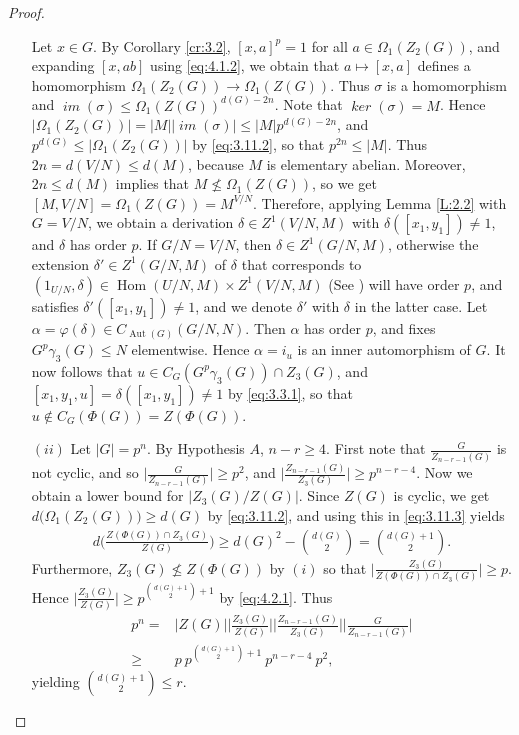 \documentclass[preprint,sort&compress,12pt]{elsarticle}
\theoremstyle{definition}
\numberwithin{equation}{theorem}
\DeclareMathOperator{\Aut}{\operatorname{Aut}}
\DeclareMathOperator{\Hom}{\operatorname{Hom}}
\DeclareMathOperator{\Ker}{\mathit{ker}}
\DeclareMathOperator{\im}{\mathit{im}}
\begin{document}
\begin{proof}
\begin{itemize}
\noindent Let $x\in G$. By Corollary \ref{cr:3.2}, $[x, a]^p=1$ for all $a\in \Omega_1(Z_2(G))$, and expanding $[x, ab]$ using \eqref{eq:4.1.2}, we obtain that $a\mapsto [x, a]$ defines a homomorphism $\Omega_1(Z_2(G))\rightarrow \Omega_1(Z(G))$. Thus $\sigma$ is a homomorphism and $\im(\sigma)\le \Omega_1(Z(G))^{d(G)-2n}$. Note that $\Ker(\sigma)=M$. Hence $|\Omega_1(Z_2(G))|=|M||\im(\sigma)|\le |M|p^{d(G)-2n}$, and $p^{d(G)}\le |\Omega_1(Z_2(G))|$ by \eqref{eq:3.11.2}, so that $p^{2n}\le |M|$. Thus $2n=d(V/N)\le d(M)$, because $M$ is elementary abelian. Moreover, $2n\le d(M)$ implies that $M\not\le \Omega_1(Z(G))$, so we get $[M, V/N]=\Omega_1(Z(G))=M^{V/N}$. Therefore, applying Lemma \ref{L:2.2} with $G=V/N$, we obtain a derivation $\delta\in Z^1(V/N, M)$ with $\delta([x_1, y_1])\neq 1$, and $\delta$ has order $p$. If $G/N=V/N$, then $\delta\in Z^1(G/N, M)$, otherwise the extension $\delta'\in Z^1(G/N, M)$ of $\delta$ that corresponds to $(1_{U/N}, \delta)\in \Hom(U/N, M)\times Z^1(V/N, M)$ (See \cite[Lemma\ 1.2]{CG06}) will have order $p$, and satisfies $\delta'([x_1, y_1])\neq 1$, and we denote $\delta'$ with $\delta$ in the latter case. Let $\alpha= \varphi(\delta)\in C_{\Aut(G)}(G/N, N)$. Then $\alpha$ has order $p$, and fixes $G^p\gamma_3(G)\le N$ elementwise. Hence $\alpha=i_u$ is an inner automorphism of $G$. It now follows that $u\in C_G(G^p\gamma_3(G))\cap Z_3(G)$, and $[x_1, y_1, u]= \delta([x_1, y_1])\ne 1$ by \eqref{eq:3.3.1}, so that $u\not\in C_G(\Phi(G))= Z(\Phi(G))$. 
 
\item [$(ii)$] Let $|G|=p^n$. By Hypothesis $A$, $n-r\ge 4$. First note that $\frac{G}{Z_{n-r-1}(G)}$ is not cyclic, and so $\bigg|\frac{G}{Z_{n-r-1}(G)}\bigg|\ge p^2$, and $\bigg|\frac{Z_{n-r-1}(G)}{Z_3(G)}\bigg|\ge p^{n-r-4}$. Now we obtain a lower bound for $|Z_3(G)/Z(G)|$. Since $Z(G)$ is cyclic, we get $d\big(\Omega_1(Z_2(G))\big)\ge d(G)$ by \eqref{eq:3.11.2}, and using this in \eqref{eq:3.11.3} yields
\begin{align}\label{eq:4.2.1}
d\bigg(\frac{Z(\Phi(G))\cap Z_3(G)}{Z(G)}\bigg)\ge d(G)^2-{{d(G)}\choose{2}}= {{d(G)+1}\choose{2}}.
\end{align}
\noindent Furthermore, $Z_3(G)\not\le Z(\Phi(G))$ by $(i)$ so that $\bigg|\frac{Z_3(G)}{Z(\Phi(G))\cap Z_3(G)}\bigg|\ge p$. Hence $\bigg|\frac{Z_3(G)}{Z(G)}\bigg|\ge p^{{{d(G)+1}\choose{2}}+1}$ by \eqref{eq:4.2.1}. Thus
 \begin{align*}
 p^n=&\big|Z(G)\big| \bigg|\frac{Z_3(G)}{Z(G)}\bigg| \bigg|\frac{Z_{n-r-1}(G)}{Z_3(G)}\bigg| \bigg|\frac{G}{Z_{n-r-1}(G)}\bigg|\\
 \ge&p\ p^{{{d(G)+1}\choose{2}}+1}\ p^{n-r-4}\ p^2,
 \end{align*}
\noindent yielding ${{d(G)+1}\choose{2}}\le r$.
\end{itemize}
\end{proof}
\end{document}
